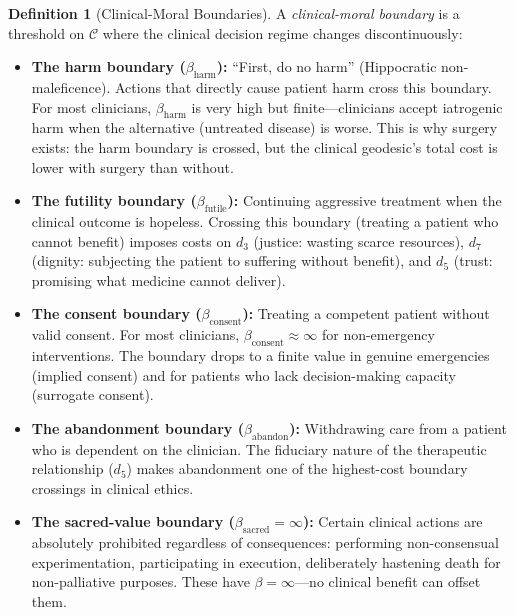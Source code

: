 \documentclass[12pt]{article}
\theoremstyle{definition}
\newtheorem{definition}[theorem]{Definition}
\theoremstyle{remark}
\newcommand{\C}{\mathcal{C}}               %
\begin{document}
\begin{definition}[Clinical-Moral Boundaries]
\label{def:clinical_boundaries}
A \emph{clinical-moral boundary} is a threshold on $\C$ where the clinical decision regime changes discontinuously:

\begin{itemize}
    \item \textbf{The harm boundary ($\beta_{\text{harm}}$):} ``First, do no harm'' (Hippocratic non-maleficence).  Actions that directly cause patient harm cross this boundary.  For most clinicians, $\beta_{\text{harm}}$ is very high but finite---clinicians accept iatrogenic harm when the alternative (untreated disease) is worse.  This is why surgery exists: the harm boundary is crossed, but the clinical geodesic's total cost is lower with surgery than without.

    \item \textbf{The futility boundary ($\beta_{\text{futile}}$):} Continuing aggressive treatment when the clinical outcome is hopeless.  Crossing this boundary (treating a patient who cannot benefit) imposes costs on $d_3$ (justice: wasting scarce resources), $d_7$ (dignity: subjecting the patient to suffering without benefit), and $d_5$ (trust: promising what medicine cannot deliver).

    \item \textbf{The consent boundary ($\beta_{\text{consent}}$):} Treating a competent patient without valid consent.  For most clinicians, $\beta_{\text{consent}} \approx \infty$ for non-emergency interventions.  The boundary drops to a finite value in genuine emergencies (implied consent) and for patients who lack decision-making capacity (surrogate consent).

    \item \textbf{The abandonment boundary ($\beta_{\text{abandon}}$):} Withdrawing care from a patient who is dependent on the clinician.  The fiduciary nature of the therapeutic relationship ($d_5$) makes abandonment one of the highest-cost boundary crossings in clinical ethics.

    \item \textbf{The sacred-value boundary ($\beta_{\text{sacred}} = \infty$):}  Certain clinical actions are absolutely prohibited regardless of consequences: performing non-consensual experimentation, participating in execution, deliberately hastening death for non-palliative purposes.  These have $\beta = \infty$---no clinical benefit can offset them.
\end{itemize}
\end{definition}
\end{document}
